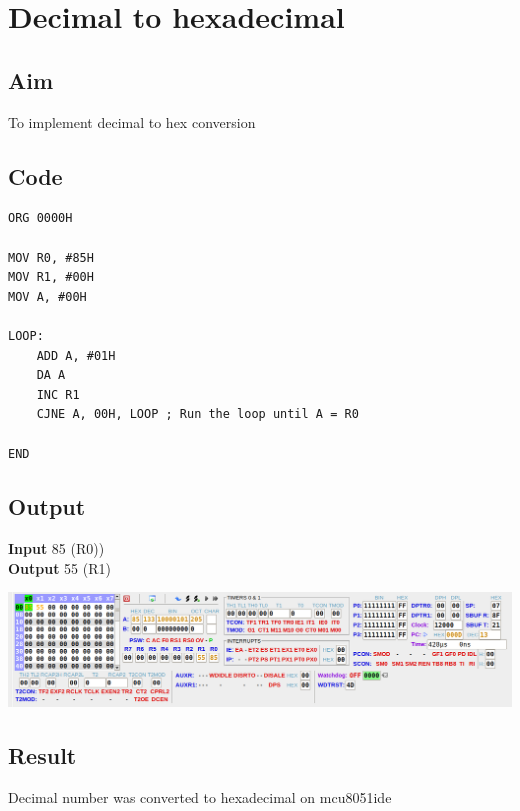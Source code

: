 \section{Decimal to hexadecimal}
\subsection{Aim}
To implement decimal to hex conversion

\subsection{Code}
\begin{lstlisting}
ORG 0000H

MOV R0, #85H
MOV R1, #00H
MOV A, #00H

LOOP:
	ADD A, #01H
	DA A
	INC R1
	CJNE A, 00H, LOOP ; Run the loop until A = R0

END
\end{lstlisting}

\subsection{Output}
\textbf{Input} 85 (R0))\\
\textbf{Output} 55 (R1)\\
\begin{center}
	\includegraphics[width=\textwidth]{img/p32.png}
\end{center}


\subsection{Result}
Decimal number was converted to hexadecimal on mcu8051ide